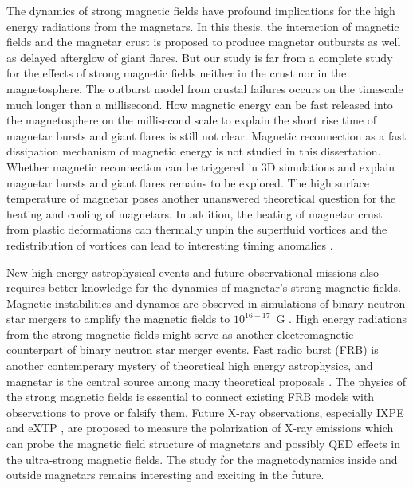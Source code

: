 The dynamics of strong magnetic fields have profound implications for the high energy radiations from the magnetars.
In this thesis, the interaction of magnetic fields and the magnetar crust is proposed to produce magnetar outbursts as well as delayed afterglow of giant flares.
But our study is far from a complete study for the effects of strong magnetic fields neither in the crust nor in the magnetosphere.
The outburst model from crustal failures occurs on the timescale much longer than a millisecond.
How magnetic energy can be fast released into the magnetosphere on the millisecond scale to explain the short rise time of magnetar bursts and giant flares is still not clear.
Magnetic reconnection as a fast dissipation mechanism of magnetic energy is not studied in this dissertation.
Whether magnetic reconnection can be triggered in 3D simulations and explain magnetar bursts and giant flares remains to be explored.
The high surface temperature of magnetar poses another unanswered theoretical question for the heating and cooling of magnetars.
In addition, the heating of magnetar crust from plastic deformations can thermally unpin the superfluid vortices and the redistribution of vortices can lead to interesting timing anomalies \citep{1996ApJ...457..844L}.

New high energy astrophysical events and future observational missions also requires better knowledge for the dynamics of magnetar's strong magnetic fields.
Magnetic instabilities and dynamos are observed in simulations of binary neutron star mergers to amplify the magnetic fields to $10^{16-17}$~G \citep{2014PhRvD..90d1502K,2015ApJ...809...39G}.
High energy radiations from the strong magnetic fields might serve as another electromagnetic counterpart of binary neutron star merger events.
Fast radio burst (FRB) is another contemperary mystery of theoretical high energy astrophysics, and magnetar is the central source among many theoretical proposals \citep{2017MNRAS.468.2726K,2018ApJ...868L...4M,2019MNRAS.485.4091M}.
The physics of the strong magnetic fields is essential to connect existing FRB models with observations to prove or falsify them.
Future X-ray observations, especially IXPE \citep{WEISSKOPF20161179} and eXTP \citep{2016SPIE.9905E..1QZ}, are proposed to measure the polarization of X-ray emissions which can probe the magnetic field structure of magnetars and possibly QED effects in the ultra-strong magnetic fields.
The study for the magnetodynamics inside and outside magnetars remains interesting and exciting in the future.





